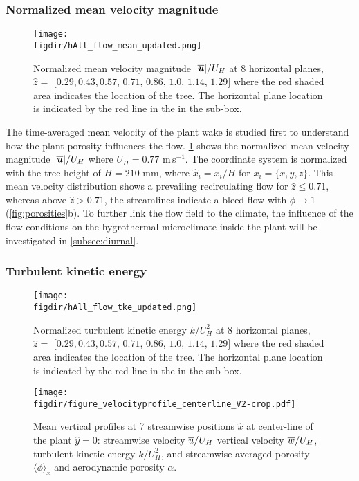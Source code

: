 \subsubsection*{Normalized mean velocity magnitude}
	
\begin{sidewaysfigure}[p]
	\centering
	\texttt{[image: \\figdir/hAll\_flow\_mean\_updated.png]}
	\caption{Normalized mean velocity magnitude $|\overline{\textbf{\textit{u}}}|/U_H$ at 8 horizontal planes, $\hat{z}=$ [$0.29$,\,$0.43$,\,$0.57$, $0.71$, $0.86$, $1.0$, $1.14$, $1.29]$ where the red shaded area indicates the location of the tree. The horizontal plane location is indicated by the red line in the in the sub-box.}
	\label{fig:meanflow}
\end{sidewaysfigure}

The time-averaged mean velocity of the plant wake is studied first to understand how the plant porosity influences the flow. \cref{fig:meanflow} shows the normalized mean velocity magnitude  $|\overline{\textbf{\textit{u}}}|/U_H$ where $U_H=0.77$ m\,s$^{-1}$. The coordinate system is normalized with the tree height of $H=210$ mm, where $\hat{x}_i=x_i/H$ for $x_i=\{x,y,z\}$. This mean velocity distribution shows a prevailing recirculating flow for $\hat{z} \le 0.71$, whereas above $\hat{z} > 0.71$, the streamlines indicate a bleed flow with $\phi\rightarrow1$ (\cref{fig:porosities}b). To further link the flow field to the climate, the influence of the flow conditions on the hygrothermal microclimate inside the plant will be investigated in \cref{subsec:diurnal}.

\subsubsection*{Turbulent kinetic energy}
		
	\begin{sidewaysfigure}[p]
		\centering
		\texttt{[image: \\figdir/hAll\_flow\_tke\_updated.png]}
		\caption{Normalized turbulent kinetic energy $k/U_H^2$ at 8 horizontal planes, $\hat{z}=$ [$0.29$,\,$0.43$,\,$0.57$, $0.71$, $0.86$, $1.0$, $1.14$, $1.29]$ where the red shaded area indicates the location of the tree. The horizontal plane location is indicated by the red line in the in the sub-box.}
		\label{fig:tke}
	\end{sidewaysfigure}

\begin{sidewaysfigure}[p]	
	\centering
	\texttt{[image: \\figdir/figure\_velocityprofile\_centerline\_V2-crop.pdf]}
	\caption{Mean vertical profiles at 7 streamwise positions $\hat{x}$ at center-line of the plant $\hat{y} = 0$:  streamwise velocity $\overline{u}/U_H$  vertical velocity $\overline{w}/U_H$,   turbulent kinetic energy $k/U_H^2$, and  streamwise-averaged porosity $\langle \phi \rangle_x$ and aerodynamic porosity $\alpha$.}
	\label{fig:verticalprofile}
\end{sidewaysfigure}

